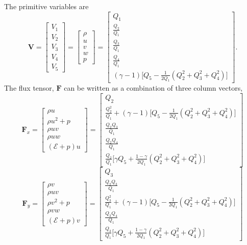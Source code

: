 \documentclass{report}
\begin{document}
The primitive variables are   %
\begin{equation}
	\mathbf{V} = 
	\begin{bmatrix}
		V_1 \\ V_2 \\ V_3 \\ V_4 \\ V_5
	\end{bmatrix} = 
	\begin{bmatrix}
		\rho \\ u \\ v \\ w \\ p
	\end{bmatrix} = 
	\begin{bmatrix}
		Q_1 \\
		\frac{Q_2}{Q_1} \\
		\frac{Q_3}{Q_1} \\
		\frac{Q_4}{Q_1} \\
	(\gamma-1) \big[Q_5 - \frac{1}{2 Q_1} ( Q_2^2 + Q_3^2 + Q_4^2) \big]
	\end{bmatrix}. \label{eq:prim_var} 
\end{equation}
The flux tensor, $\mathbf{F}$ can be written as a combination of three column vectors,
\begin{equation}
	\mathbf{F}_x = 
	\begin{bmatrix}
		\rho u \\
		\rho u^2 + p \\
		\rho u v \\
		\rho u w \\
		( \mathcal{E} + p ) u 
	\end{bmatrix} =
	\begin{bmatrix}
		Q_2 \\
		\frac{Q_2^2}{Q_1} + (\gamma-1) \big[ Q_5 - \frac{1}{2 Q_1} (Q_2^2 + Q_3^2 + Q_4^2) \big] \\
		\frac{Q_2 Q_3}{Q_1} \\
		\frac{Q_2 Q_4}{Q_1} \\
		\frac{Q_2}{Q_1} \big[ \gamma Q_5 + \frac{1-\gamma}{2 Q_1} (Q_2^2+Q_3^2+Q_4^2) \big] 
	\end{bmatrix}
\end{equation}
\begin{equation}
	\mathbf{F}_y = 
	\begin{bmatrix}
		\rho v \\
		\rho uv \\
		\rho v^2 + p \\
		\rho v w \\
		( \mathcal{E} + p ) v
	\end{bmatrix} =
	\begin{bmatrix}
		Q_3 \\
		\frac{Q_2 Q_3}{Q_1} \\
		\frac{Q_3^2}{Q_1} + (\gamma-1) \big[ Q_5 - \frac{1}{2 Q_1} (Q_2^2 + Q_3^2 + Q_4^2) \big] \\
		\frac{Q_3 Q_4}{Q_1} \\
		\frac{Q_3}{Q_1} \big[ \gamma Q_5 + \frac{1-\gamma}{2 Q_1} (Q_2^2+Q_3^2+Q_4^2) \big] 
	\end{bmatrix}
\end{equation}
\end{document}
